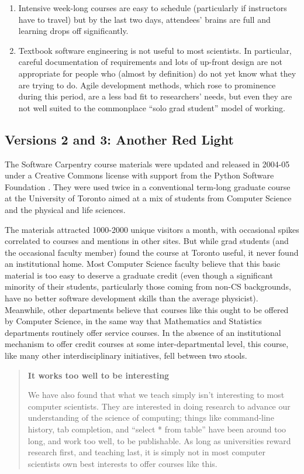\documentclass[10pt,a4paper,twocolumn]{article}
\begin{document}
\begin{enumerate}
\item
  Intensive week-long courses are easy to schedule (particularly if
  instructors have to travel) but by the last two days, attendees'
  brains are full and learning drops off significantly.
\item
  Textbook software engineering is not useful to most scientists. In
  particular, careful documentation of requirements and lots of
  up-front design are not appropriate for people who (almost by
  definition) do not yet know what they are trying to do. Agile
  development methods, which rose to prominence during this period,
  are a less bad fit to researchers' needs, but even they are not well
  suited to the commonplace ``solo grad student'' model of working.
\end{enumerate}

\subsection*{Versions 2 and 3: Another Red Light}

The Software Carpentry course materials were updated and released in
2004-05 under a Creative Commons license with support from the
Python Software Foundation \cite{wilson2006b}. They were used twice in
a conventional term-long graduate course at the University of Toronto
aimed at a mix of students from Computer Science and the physical and
life sciences.

The materials attracted 1000-2000 unique visitors a month, with
occasional spikes correlated to courses and mentions in other
sites. But while grad students (and the occasional faculty member)
found the course at Toronto useful, it never found an institutional
home.  Most Computer Science faculty believe that this basic material
is too easy to deserve a graduate credit (even though a significant
minority of their students, particularly those coming from non-CS
backgrounds, have no better software development skills than the
average physicist). Meanwhile, other departments believe that courses
like this ought to be offered by Computer Science, in the same way
that Mathematics and Statistics departments routinely offer service
courses.  In the absence of an institutional mechanism to offer credit
courses at some inter-departmental level, this course, like many other
interdisciplinary initiatives, fell between two stools.

\begin{quote}
\textbf{It works too well to be interesting}

We have also found that what we teach simply isn't interesting to most
computer scientists. They are interested in doing research to advance
our understanding of the science of computing; things like
command-line history, tab completion, and ``select * from table'' have
been around too long, and work too well, to be publishable. As long as
universities reward research first, and teaching last, it is simply
not in most computer scientists own best interests to offer courses
like this.
\end{quote}
\end{document}
